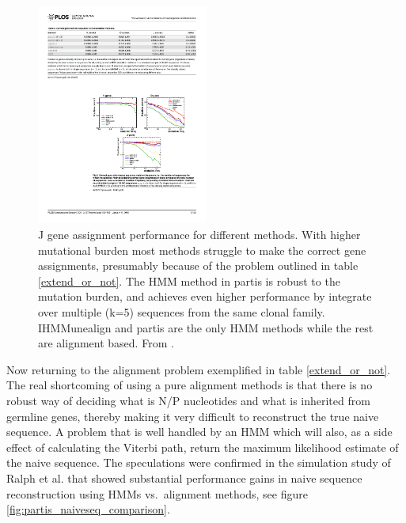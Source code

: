 \begin{figure}
    \centering
    \includegraphics[width=0.5\textwidth]{figures/partis_Jgene_comparison.pdf}
    \caption{
        \label{fig:partis_Jgene_comparison}
        J gene assignment performance for different methods.
        With higher mutational burden most methods struggle to make the correct gene assignments, presumably because of the problem outlined in table \ref{extend_or_not}.
        The HMM method in partis is robust to the mutation burden, and achieves even higher performance by integrate over multiple (k=5) sequences from the same clonal family.
        IHMMunealign and partis are the only HMM methods while the rest are alignment based.
        From \cite{ralph2016consistency}.
    }
\end{figure}


Now returning to the alignment problem exemplified in table \ref{extend_or_not}.
The real shortcoming of using a pure alignment methods is that there is no robust way of deciding what is N/P nucleotides and what is inherited from germline genes, thereby making it very difficult to reconstruct the true naive sequence.
A problem that is well handled by an HMM which will also, as a side effect of calculating the Viterbi path, return the maximum likelihood estimate of the naive sequence.
The speculations were confirmed in the simulation study of Ralph et al. that showed substantial performance gains in naive sequence reconstruction using HMMs vs.\ alignment methods, see figure \ref{fig:partis_naiveseq_comparison}.


